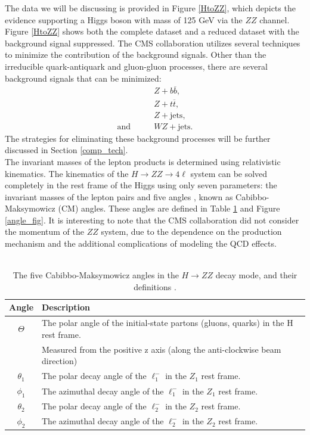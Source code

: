\documentclass[12pt]{article}
\newcommand{\npar}{\\[0.5cm] \noindent}
\begin{document}
The data we will be discussing is provided in Figure \ref{HtoZZ}, which depicts the evidence supporting a Higgs boson with mass of 125 GeV via the $ZZ$ channel. Figure \ref{HtoZZ} shows both the complete dataset and a reduced dataset with the background signal suppressed. The CMS collaboration utilizes several techniques to minimize the contribution of the background signals. Other than the irreducible quark-antiquark and gluon-gluon processes, there are several background signals that can be minimized\cite{new_higgs}:
\begin{align}
& Z + b \overline{b}, \\
& Z + t \overline{t}, \\
& Z + \text{jets}, \\
\text{and} \qquad & WZ + \text{jets} .
\end{align}
The strategies for eliminating these background processes will be further discussed in Section \ref*{comp_tech}.
\npar
The invariant masses of the lepton products is determined using relativistic kinematics. The kinematics of the $H \to ZZ \to 4 \ell$ system can be solved completely in the rest frame of the Higgs using only seven parameters: the invariant masses of the lepton pairs and five angles \cite{new_higgs}, known as Cabibbo-Maksymowicz (CM) angles\cite{higgs_angles}. These angles are defined in Table \ref{angle_table} and Figure \ref{angle_fig}. It is interesting to note that the CMS collaboration did not consider the momentum of the $ZZ$ system, due to the dependence on the production mechanism and the additional complications of modeling the QCD effects\cite{new_higgs}. \\ \\
\begin{table}[h!]
\centering
\begin{tabular}{|c|l|}
\hline
Angle & Description \\ \hline \hline
$\Theta$ & The polar angle of the initial-state partons (gluons, quarks) in the H rest frame. \\ & Measured from the positive z axis (along the anti-clockwise beam direction) \\ \hline
$\theta_1$ & The polar decay angle of the $\ell_1^-$ in the $Z_1$ rest frame. \\ \hline
$\phi_1$ & The azimuthal decay angle of the $\ell_1^-$ in the $Z_1$ rest frame. \\ \hline  
$\theta_2$ & The polar decay angle of the $\ell_2^-$ in the $Z_2$ rest frame. \\ \hline
$\phi_2$ &  The azimuthal decay angle of the $\ell_2^-$ in the $Z_2$ rest frame. \\ \hline
\end{tabular}
\caption{The five Cabibbo-Maksymowicz angles in the $H \to ZZ$ decay mode, and their definitions \cite{higgs_angles}.}
\label{angle_table}
\end{table}
\end{document}

